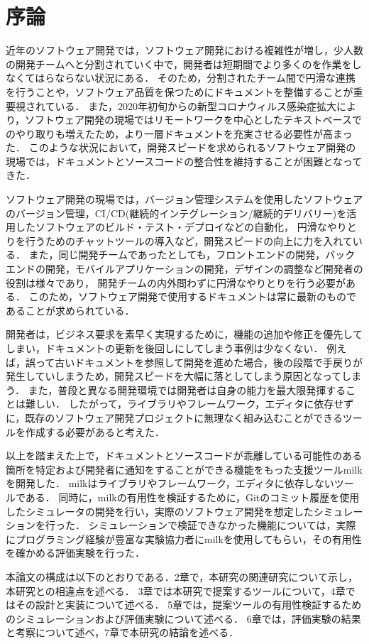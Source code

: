 \chapter{序論}
近年のソフトウェア開発では，ソフトウェア開発における複雑性が増し，少人数の開発チームへと分割されていく中で，開発者は短期間でより多くのを作業をしなくてはらならない状況にある．
そのため，分割されたチーム間で円滑な連携を行うことや，ソフトウェア品質を保つためにドキュメントを整備することが重要視されている．
また，2020年初旬からの新型コロナウィルス感染症拡大により，ソフトウェア開発の現場ではリモートワークを中心としたテキストベースでのやり取りも増えたため，より一層ドキュメントを充実させる必要性が高まった．
このような状況において，開発スピードを求められるソフトウェア開発の現場では，ドキュメントとソースコードの整合性を維持することが困難となってきた．

ソフトウェア開発の現場では，バージョン管理システムを使用したソフトウェアのバージョン管理，CI/CD(継続的インテグレーション/継続的デリバリー)を活用したソフトウェアのビルド・テスト・デプロイなどの自動化，
円滑なやりとりを行うためのチャットツールの導入など，開発スピードの向上に力を入れている．
また，同じ開発チームであったとしても，フロントエンドの開発，バックエンドの開発，モバイルアプリケーションの開発，デザインの調整など開発者の役割は様々であり，
開発チームの内外問わずに円滑なやりとりを行う必要がある．
このため，ソフトウェア開発で使用するドキュメントは常に最新のものであることが求められている．

開発者は，ビジネス要求を素早く実現するために，機能の追加や修正を優先してしまい，ドキュメントの更新を後回しにしてしまう事例は少なくない．
例えば，誤って古いドキュメントを参照して開発を進めた場合，後の段階で手戻りが発生していしまうため，開発スピードを大幅に落としてしまう原因となってしまう．
また，普段と異なる開発環境では開発者は自身の能力を最大限発揮することは難しい．
したがって，ライブラリやフレームワーク，エディタに依存せずに，既存のソフトウェア開発プロジェクトに無理なく組み込むことができるツールを作成する必要があると考えた．

以上を踏まえた上で，ドキュメントとソースコードが乖離している可能性のある箇所を特定および開発者に通知をすることができる機能をもった支援ツールmilkを開発した．
milkはライブラリやフレームワーク，エディタに依存しないツールである．
同時に，milkの有用性を検証するために，Gitのコミット履歴を使用したシミュレータの開発を行い，実際のソフトウェア開発を想定したシミュレーションを行った．
シミュレーションで検証できなかった機能については，実際にプログラミング経験が豊富な実験協力者にmilkを使用してもらい，その有用性を確かめる評価実験を行った．

本論文の構成は以下のとおりである．2章で，本研究の関連研究について示し，本研究との相違点を述べる．
3章では本研究で提案するツールについて，4章ではその設計と実装について述べる．
5章では，提案ツールの有用性検証するためのシミュレーションおよび評価実験について述べる．
6章では，評価実験の結果と考察について述べ，7章で本研究の結論を述べる．